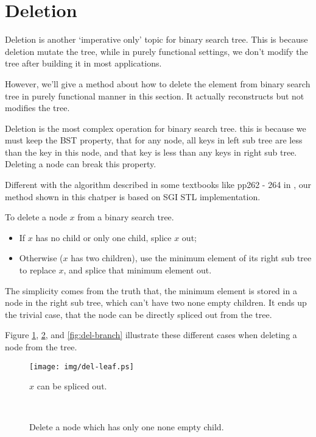\documentclass{article}
\begin{document}
\section{Deletion}
Deletion is another `imperative only' topic for binary search tree.
This is because deletion mutate the tree, while in purely functional
settings, we don't modify the tree after building it in most
applications.

However, we'll give a method about how to delete the element from
binary search tree in purely functional manner in this section.
It actually reconstructs but not modifies the tree.

Deletion is the most complex operation for binary search tree.
this is because we must keep the BST property, that for any node,
all keys in left sub tree are less than the key in this node, and
that key is less than any keys in right sub tree. Deleting a node
can break this property.

Different with the algorithm described in some textbooks like pp262 - 264 in \cite{CLRS},
our method shown in this chatper is based on SGI STL implementation.\cite{sgi-stl}

To delete a node $x$ from a binary search tree.
\begin{itemize}
\item If $x$ has no child or only one child, splice $x$ out;
\item Otherwise ($x$ has two children), use the minimum element of its right sub tree to replace $x$, and splice that minimum element out.
\end{itemize}

The simplicity comes from the truth that, the minimum element is stored
in a node in the right sub tree, which can't have two none empty children.
It ends up the trivial case, that the node can be directly spliced
out from the tree.

Figure \ref{fig:del-leaf}, \ref{fig:del-1child}, and \ref{fig:del-branch}
illustrate these different cases when deleting a node from the tree.

\begin{figure}[htbp]
  \centering
  \texttt{[image: img/del-leaf.ps]}
  \caption{$x$ can be spliced out.} \label{fig:del-leaf}
\end{figure}

\begin{figure}[htbp]
  \centering
   \\
  \caption{Delete a node which has only one none empty child.}
  \label{fig:del-1child}
\end{figure}
\end{document}

